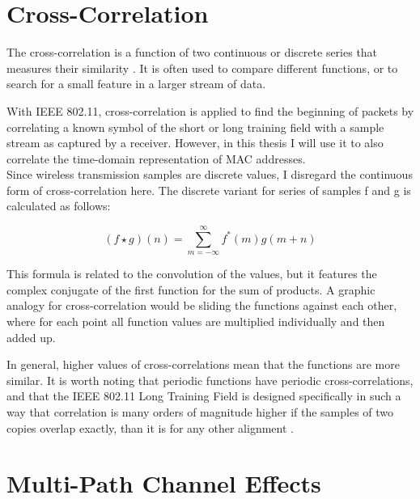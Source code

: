 
\section{Cross-Correlation}

The cross-correlation is a function of two continuous or discrete series that measures their similarity \cite{rabiner1978}. It is often used to compare different functions, or to search for a small feature in a larger stream of data.

With \gls{IEEE} 802.11, cross-correlation is applied to find the beginning of packets by correlating a known symbol of the short or long training field with a sample stream as captured by a receiver. However, in this thesis I will use it to also correlate the time-domain representation of \gls{MAC} addresses.\\

Since wireless transmission samples are discrete values, I disregard the continuous form of cross-correlation here. The discrete variant for series of samples f and g is calculated as follows:

$$ (f \star g)(n) = \sum_{m=-\infty}^{\infty} f^{\ast}(m) g(m+n) $$\vspace{0cm}

This formula is related to the convolution of the values, but it features the complex conjugate of the first function for the sum of products. A graphic analogy for cross-correlation would be sliding the functions against each other, where for each point all function values are multiplied individually and then added up.

In general, higher values of cross-correlations mean that the functions are more similar. It is worth noting that periodic functions have periodic cross-correlations, and that the \gls{IEEE} 802.11 Long Training Field is designed specifically in such a way that correlation is many orders of magnitude higher if the samples of two copies overlap exactly, than it is for any other alignment \cite{perahia2013}.



\section{Multi-Path Channel Effects}\label{sec:multipath}

